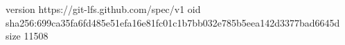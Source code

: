 version https://git-lfs.github.com/spec/v1
oid sha256:699ca35fa6fd485e51efa16e81fc01c1b7bb032e785b5eea142d3377bad6645d
size 11508
